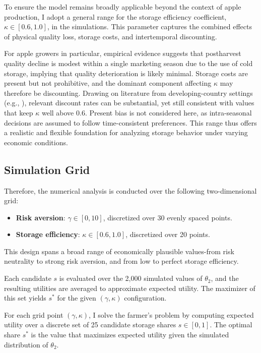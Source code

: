 To ensure the model remains broadly applicable beyond the context of apple production, I adopt a general range for the storage efficiency coefficient, $\kappa \in [0.6, 1.0]$, in the simulations. This parameter captures the combined effects of physical quality loss, storage costs, and intertemporal discounting.

For apple growers in particular, empirical evidence suggests that postharvest quality decline is modest within a single marketing season due to the use of cold storage, implying that quality deterioration is likely minimal. Storage costs are present but not prohibitive, and the dominant component affecting $\kappa$ may therefore be discounting. Drawing on literature from developing-country settings (e.g., \cite{frederick2002time, tanaka2010risk, bauer2012behavioral, saitone2018price, Belissa2019Liquidity, liu2020delayed, Umar2025Drivers}), relevant discount rates can be substantial, yet still consistent with values that keep $\kappa$ well above 0.6. Present bias is not considered here, as intra-seasonal decisions are assumed to follow time-consistent preferences. This range thus offers a realistic and flexible foundation for analyzing storage behavior under varying economic conditions.






\subsection{Simulation Grid}
\noindent Therefore, the numerical analysis is conducted over the following two-dimensional grid:
\begin{itemize}
\item \textbf{Risk aversion}: $\gamma \in [0, 10]$, discretized over 30 evenly spaced points.
\item \textbf{Storage efficiency}: $\kappa \in [0.6, 1.0]$, discretized over 20 points.
\end{itemize}

This design spans a broad range of economically plausible values-from risk neutrality to strong risk aversion, and from low to perfect storage efficiency.

Each candidate $s$ is evaluated over the 2,000 simulated values of $\theta_2$, and the resulting utilities are averaged to approximate expected utility. The maximizer of this set yields $s^*$ for the given $(\gamma, \kappa)$ configuration.

For each grid point $(\gamma, \kappa)$, I solve the farmer's problem by computing expected utility over a discrete set of 25 candidate storage shares $s \in [0, 1]$. The optimal share $s^*$ is the value that maximizes expected utility given the simulated distribution of $\theta_2$.




